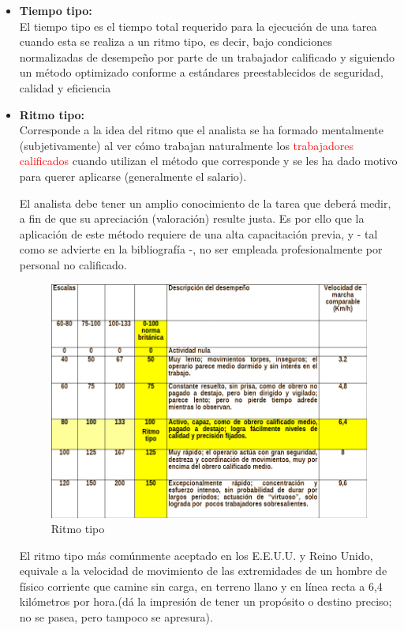 \documentclass[a4paper,oneside,11pt]{article}
\begin{document}
\begin{itemize}
    \item \textbf{Tiempo tipo:} \\
    El tiempo tipo es el tiempo total requerido para la ejecución de una tarea cuando esta se realiza a un ritmo tipo, es decir, bajo condiciones normalizadas de desempeño por parte de un trabajador calificado y siguiendo un método optimizado conforme a estándares preestablecidos de seguridad, calidad y eficiencia

    \item \textbf{Ritmo tipo:} \\
    Corresponde a la idea del ritmo que el analista  se ha formado mentalmente (subjetivamente) al ver cómo trabajan naturalmente los \textcolor{red}{trabajadores calificados} cuando utilizan el método que corresponde y se les ha dado motivo para querer aplicarse (generalmente el  salario).

    El analista debe tener un amplio conocimiento de la tarea que deberá medir, a fin de que su apreciación (valoración) resulte justa. Es por ello que la aplicación de este método requiere de una alta capacitación previa, y - tal como se advierte en la bibliografía -, no ser empleada profesionalmente por personal no calificado. 

    \begin{figure} [ht!]
        \centering
        \includegraphics[scale=.55]{ritmo tipo.png}
        \caption{Ritmo tipo}
        \label{fig:enter-label}
    \end{figure}
    
    El ritmo tipo más comúnmente aceptado en los E.E.U.U. y Reino Unido, equivale a la velocidad de movimiento de las extremidades de un hombre de físico corriente que camine sin carga, en terreno llano y en línea recta a 6,4 kilómetros por hora.(dá la impresión de tener un propósito o destino preciso; no se pasea, pero tampoco se apresura).


\end{itemize}
\end{document}
